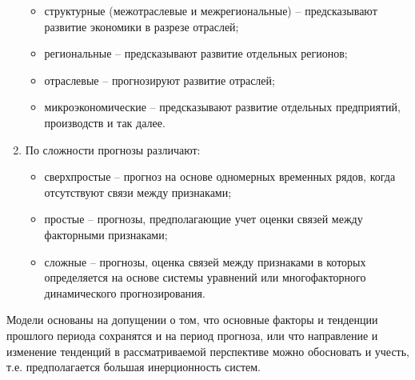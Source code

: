 \begin{enumerate}
\begin{itemize}
	\item структурные  (межотраслевые и межрегиональные) – предсказывают развитие экономики в разрезе отраслей;
	\item региональные – предсказывают развитие отдельных регионов;
	\item отраслевые – прогнозируют развитие отраслей;
	\item микроэкономические – предсказывают развитие отдельных предприятий, производств и так далее.
	\end{itemize}
\item По сложности прогнозы различают:
	\begin{itemize}
		\item сверхпростые – прогноз на основе одномерных временных рядов, когда отсутствуют связи между признаками;
		\item простые – прогнозы, предполагающие учет оценки связей между факторными признаками;
		\item сложные – прогнозы, оценка связей между признаками в которых определяется на основе системы уравнений или многофакторного динамического прогнозирования.
		\end{itemize}
\end{enumerate}

Модели основаны на допущении о том, что основные факторы и тенденции прошлого периода сохранятся и на период прогноза, или что направление и изменение тенденций в рассматриваемой перспективе можно обосновать и учесть, т.е. предполагается большая инерционность систем. 

